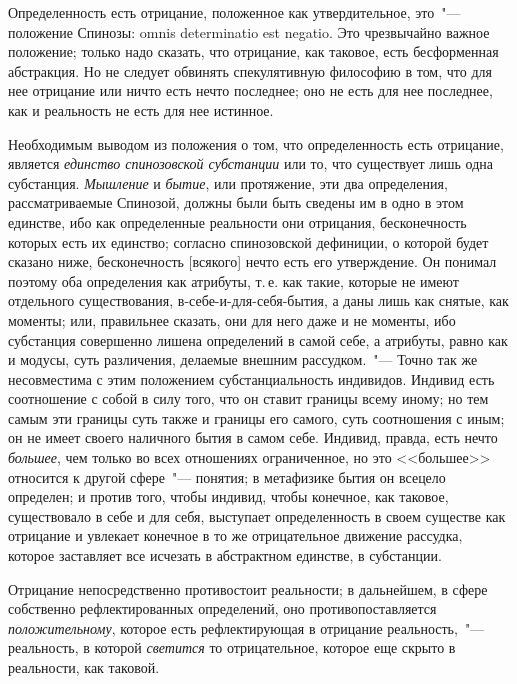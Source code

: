 Определенность есть отрицание, положенное как утвердительное,
это~"--- положение Спинозы: omnis determinatio
est negatio\endnotemark{}. Это чрезвычайно важное положение;
только надо сказать, что отрицание, как таковое, есть
бесформенная абстракция. Но не следует обвинять спекулятивную
философию в том, что для нее отрицание
или ничто есть нечто последнее; оно не есть для нее
последнее, как и реальность не есть для нее истинное.


Необходимым выводом из положения о том, что определенность
есть отрицание, является \emph{единство спинозовской
субстанции} или то, что существует лишь одна субстанция.
\emph{Мышление} и \emph{бытие}, или протяжение, эти два определения,
рассматриваемые Спинозой, должны были быть
сведены им в одно в этом единстве, ибо как определенные
реальности они отрицания, бесконечность которых
есть их единство; согласно спинозовской дефиниции, о
которой будет сказано ниже, бесконечность [всякого] нечто
есть его утверждение. Он понимал поэтому оба определения
как атрибуты, т.\,е. как такие, которые не имеют
отдельного существования, в-себе-и-для-себя-бытия, а даны
лишь как снятые, как моменты; или, правильнее
сказать, они для него даже и не моменты, ибо субстанция
совершенно лишена определений в самой себе, а
атрибуты, равно как и модусы, суть различения, делаемые
внешним рассудком.~"--- Точно так же несовместима с этим
положением субстанциальность индивидов. Индивид есть
соотношение с собой в силу того, что он ставит границы
всему иному; но тем самым эти границы суть также
и границы его самого, суть соотношения с иным; он
не имеет своего наличного бытия в самом себе. Индивид,
правда, есть нечто \emph{большее}, чем только во всех отношениях
ограниченное, но это <<большее>> относится к другой
сфере~"--- понятия; в метафизике бытия он всецело определен;
и против того, чтобы индивид, чтобы конечное, как
таковое, существовало в себе и для себя, выступает определенность
в своем существе как отрицание и увлекает
конечное в то же отрицательное движение рассудка, которое
заставляет все исчезать в абстрактном единстве,
в субстанции.

Отрицание непосредственно противостоит реальности;
в дальнейшем, в сфере собственно рефлектированных
определений, оно противопоставляется \emph{положительному},
которое есть рефлектирующая в отрицание реальность,~"---
реальность, в которой \emph{светится} то отрицательное, которое
еще скрыто в реальности, как таковой.

